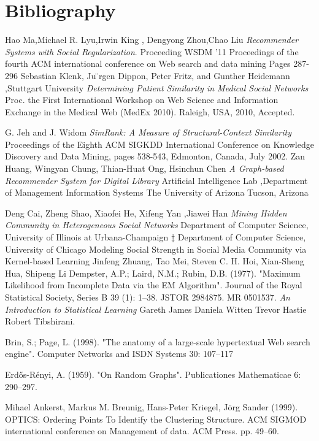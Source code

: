 \documentclass[a4paper]{article}
\begin{document}
\section{Bibliography}
\begin{thebibliography}{9}

Hao Ma,Michael R. Lyu,Irwin King , Dengyong Zhou,Chao Liu
  \emph{Recommender Systems with Social Regularization}.
 Proceeding
WSDM '11 Proceedings of the fourth ACM international conference on Web search and data mining
Pages 287-296 
    Sebastian Klenk, Ju ̈rgen Dippon, Peter Fritz, and Gunther Heidemann ,Stuttgart University
  \emph{Determining Patient Similarity in Medical Social Networks}
   Proc. the First International Workshop on Web Science and Information Exchange in the Medical Web (MedEx 2010).  Raleigh, USA,  2010, Accepted.
 
    G. Jeh and J. Widom
  \emph{SimRank: A Measure of Structural-Context Similarity}
  Proceedings of the Eighth ACM SIGKDD International Conference on Knowledge Discovery and Data Mining, pages 538-543, Edmonton, Canada, July 2002.
 Zan Huang, Wingyan Chung, Thian-Huat Ong, Hsinchun Chen 
\emph{A Graph-based Recommender System for Digital Library}
Artificial Intelligence Lab  ,Department of Management Information Systems 
The University of Arizona Tucson, Arizona

Deng Cai, Zheng Shao, Xiaofei He, Xifeng Yan ,Jiawei Han
\emph{Mining Hidden Community in Heterogeneous Social Networks}
Department of Computer Science, University of Illinois at Urbana-Champaign ‡ Department of Computer Science, University of Chicago
Modeling Social Strength in Social Media Community via Kernel-based Learning
Jinfeng Zhuang, Tao Mei, Steven C. H. Hoi, Xian-Sheng Hua, Shipeng Li
Dempster, A.P.; Laird, N.M.; Rubin, D.B. (1977). "Maximum Likelihood from Incomplete Data via the EM Algorithm". Journal of the Royal Statistical Society, Series B 39 (1): 1–38. JSTOR 2984875. MR 0501537.  
\emph{An Introduction to Statistical Learning}
Gareth James Daniela Witten Trevor Hastie Robert Tibshirani.

Brin, S.; Page, L. (1998). "The anatomy of a large-scale hypertextual Web search engine". Computer Networks and ISDN Systems 30: 107–117

 Erd\H{o}s-R\'enyi, A. (1959). "On Random Graphs". Publicationes Mathematicae 6: 290–297.

Mihael Ankerst, Markus M. Breunig, Hans-Peter Kriegel, Jörg Sander (1999). OPTICS: Ordering Points To Identify the Clustering Structure. ACM SIGMOD international conference on Management of data. ACM Press. pp. 49–60.
\end{thebibliography}



 \pagebreak
\end{document}
